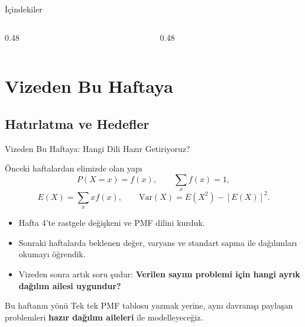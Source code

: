 \documentclass[light]{lutbeamer}
\begin{document}
\begin{frame}{İçindekiler}
  \scriptsize
  \begin{columns}[T]
    \begin{column}{0.48\textwidth}
      \tableofcontents[sections={1-3}]
    \end{column}
    \begin{column}{0.48\textwidth}
      \tableofcontents[sections={4-10}]
    \end{column}
  \end{columns}
\end{frame}

\section{Vizeden Bu Haftaya}
\subsection{Hatırlatma ve Hedefler}

\begin{frame}{Vizeden Bu Haftaya: Hangi Dili Hazır Getiriyoruz?}
    \small
    \begin{block}{Önceki haftalardan elimizde olan yapı}
        \[
        P(X=x)=f(x), \qquad \sum_x f(x)=1,
        \]
        \[
        E(X)=\sum_x x f(x), \qquad \mathrm{Var}(X)=E(X^2)-[E(X)]^2.
        \]
    \end{block}

    \begin{itemize}
        \item Hafta 4'te rastgele değişkeni ve PMF dilini kurduk.
        \item Sonraki haftalarda beklenen değer, varyans ve standart sapma ile dağılımları okumayı öğrendik.
        \item Vizeden sonra artık soru şudur: \textbf{Verilen sayım problemi için hangi ayrık dağılım ailesi uygundur?}
    \end{itemize}

    \begin{alertblock}{Bu haftanın yönü}
        Tek tek PMF tablosu yazmak yerine, aynı davranışı paylaşan problemleri \textbf{hazır dağılım aileleri} ile modelleyeceğiz.
    \end{alertblock}
\end{frame}
\end{document}
